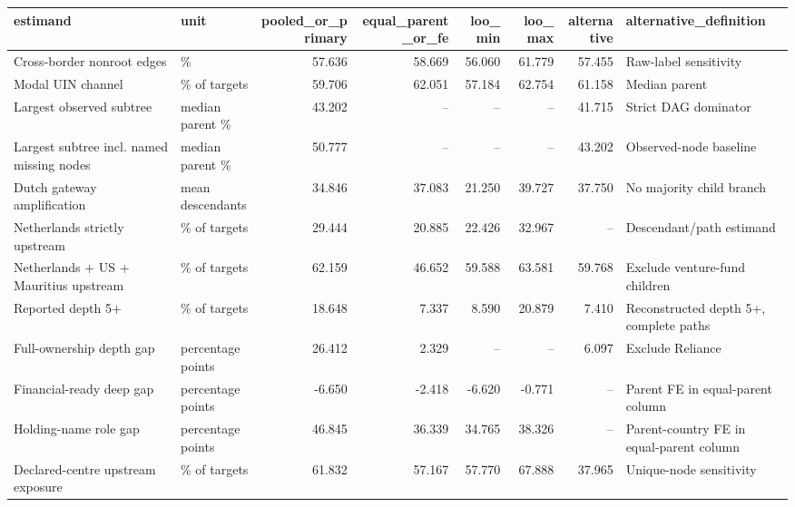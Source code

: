 \begin{tabular}{llrrrrrl}
\toprule
estimand & unit & pooled\_or\_primary & equal\_parent\_or\_fe & loo\_min & loo\_max & alternative & alternative\_definition \\
\midrule
Cross-border nonroot edges & \% & 57.636 & 58.669 & 56.060 & 61.779 & 57.455 & Raw-label sensitivity \\
Modal UIN channel & \% of targets & 59.706 & 62.051 & 57.184 & 62.754 & 61.158 & Median parent \\
Largest observed subtree & median parent \% & 43.202 & -- & -- & -- & 41.715 & Strict DAG dominator \\
Largest subtree incl. named missing nodes & median parent \% & 50.777 & -- & -- & -- & 43.202 & Observed-node baseline \\
Dutch gateway amplification & mean descendants & 34.846 & 37.083 & 21.250 & 39.727 & 37.750 & No majority child branch \\
Netherlands strictly upstream & \% of targets & 29.444 & 20.885 & 22.426 & 32.967 & -- & Descendant/path estimand \\
Netherlands + US + Mauritius upstream & \% of targets & 62.159 & 46.652 & 59.588 & 63.581 & 59.768 & Exclude venture-fund children \\
Reported depth 5+ & \% of targets & 18.648 & 7.337 & 8.590 & 20.879 & 7.410 & Reconstructed depth 5+, complete paths \\
Full-ownership depth gap & percentage points & 26.412 & 2.329 & -- & -- & 6.097 & Exclude Reliance \\
Financial-ready deep gap & percentage points & -6.650 & -2.418 & -6.620 & -0.771 & -- & Parent FE in equal-parent column \\
Holding-name role gap & percentage points & 46.845 & 36.339 & 34.765 & 38.326 & -- & Parent-country FE in equal-parent column \\
Declared-centre upstream exposure & \% of targets & 61.832 & 57.167 & 57.770 & 67.888 & 37.965 & Unique-node sensitivity \\
\bottomrule
\end{tabular}
